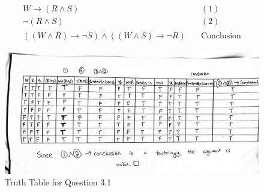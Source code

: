 \documentclass[]{article}
\begin{document}
\begin{center}
\end{center}    
\begin{align*}
    W \rightarrow (R \land S) & \quad (1) \\
    \neg(R \land S) & \quad (2) \\
    \overline{((W \land R) \rightarrow \neg S) \land ((W \land S) \rightarrow \neg R)} &  \quad \text{Conclusion}
\end{align*}


\begin{figure}[h!]
    \includegraphics[totalheight=15cm, angle=90]{images/Q3P1.jpg}
    \caption{Truth Table for Question 3.1}
\end{figure}
\end{document}
